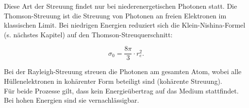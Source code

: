 Diese Art der Streuung findet nur bei niederenergetischen Photonen statt. Die Thomson-Streuung
ist die Streuung von Photonen an freien Elektronen im klassischen Limit. Bei niedrigen Energien
reduziert sich die Klein-Nishina-Formel (s. nächstes Kapitel) auf den Thomson-Streuquerschnitt:

\[ \sigma_0= \frac{8\pi}{3}\cdot r_e^2. \]

Bei der Rayleigh-Streuung streuen die Photonen am gesamten Atom, wobei alle Hüllenelektronen in
kohärenter Form beteiligt sind (kohärente Streuung).
\\
Für beide Prozesse gilt, dass kein Energieübertrag auf das Medium stattfindet. Bei hohen Energien
sind sie vernachlässigbar.
